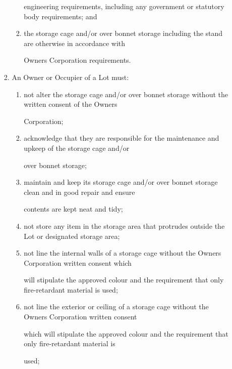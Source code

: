 \documentclass{article}
\begin{document}
\begin{enumerate}[label=\arabic*.]
\begin{enumerate}[label=\arabic{enumi}.\arabic*.]
\begin{enumerate}[label=(\arabic*)]
\begin{enumerate}[label=(\alph*)]
{\fontsize{10.02}{1}engineering requirements, including any government or statutory body requirements; and }

\item {\fontsize{9.962}{1} the storage cage and/or over bonnet storage including the stand are otherwise in accordance with }

{\fontsize{10.02}{1}Owners Corporation requirements. }

\end{enumerate}
\item {\fontsize{9.962}{1} An Owner or Occupier of a Lot must: }

\begin{enumerate}[label=(\alph*)]
\item {\fontsize{9.962}{1} not alter the storage cage and/or over bonnet storage without the written consent of the Owners }

{\fontsize{10.02}{1}Corporation; }

\item {\fontsize{9.962}{1} acknowledge that they are responsible for the maintenance and upkeep of the storage cage and/or }

{\fontsize{10.02}{1}over bonnet storage; }

\item {\fontsize{9.962}{1} maintain and keep its storage cage and/or over bonnet storage clean and in good repair and ensure }

{\fontsize{10.02}{1}contents are kept neat and tidy; }

\item {\fontsize{9.962}{1} not store any item in the storage area that protrudes outside the Lot or designated storage area; }

\item {\fontsize{9.962}{1} not line the internal walls of a storage cage without the Owners Corporation written consent which }

{\fontsize{10.02}{1}will stipulate the approved colour and the requirement that only fire-retardant material is used; }

\item {\fontsize{9.962}{1} not line the exterior or ceiling of a storage cage without the Owners Corporation written consent }

{\fontsize{10.02}{1}which will stipulate the approved colour and the requirement that only fire-retardant material is }

{\fontsize{10.02}{1}used; }


\end{enumerate}
\end{enumerate}
\end{enumerate}
\end{enumerate}
\end{document}
